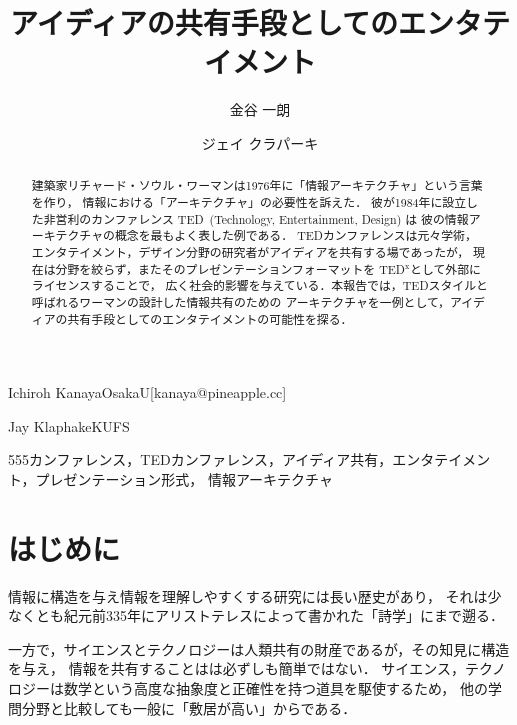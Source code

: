 \documentclass[submit,techreq,jkeyword,noauthor]{ipsj}
\newcommand{\TED}{\textrm{TED}}
\newcommand{\TEDx}{\TED${}^{\textrm{x}}$}
\begin{document}
\title{アイディアの共有手段としてのエンタテイメント}




\author{金谷 一朗}{Ichiroh Kanaya}{OsakaU}[kanaya@pineapple.cc]
\author{ジェイ クラパーキ}{Jay Klaphake}{KUFS}

\begin{abstract}
建築家リチャード・ソウル・ワーマンは1976年に「情報アーキテクチャ」という言葉を作り，
情報における「アーキテクチャ」の必要性を訴えた．
彼が1984年に設立した非営利のカンファレンス \TED\ (Technology, Entertainment, Design) は
彼の情報アーキテクチャの概念を最もよく表した例である．
\TED カンファレンスは元々学術，エンタテイメント，デザイン分野の研究者がアイディアを共有する場であったが，
現在は分野を絞らず，またそのプレゼンテーションフォーマットを \TEDx として外部にライセンスすることで，
広く社会的影響を与えている．本報告では，\TED スタイルと呼ばれるワーマンの設計した情報共有のための
アーキテクチャを一例として，アイディアの共有手段としてのエンタテイメントの可能性を探る．
\end{abstract}

\begin{jkeyword}
555カンファレンス，\TED カンファレンス，アイディア共有，エンタテイメント，プレゼンテーション形式，
情報アーキテクチャ
\end{jkeyword}

\maketitle

\section{はじめに}


情報に構造を与え情報を理解しやすくする研究には長い歴史があり，
それは少なくとも紀元前335年にアリストテレスによって書かれた「詩学」\cite{a}にまで遡る．

一方で，サイエンスとテクノロジーは人類共有の財産であるが，その知見に構造を与え，
情報を共有することはは必ずしも簡単ではない．
サイエンス，テクノロジーは数学という高度な抽象度と正確性を持つ道具を駆使するため，
他の学問分野と比較しても一般に「敷居が高い」からである．
\end{document}
